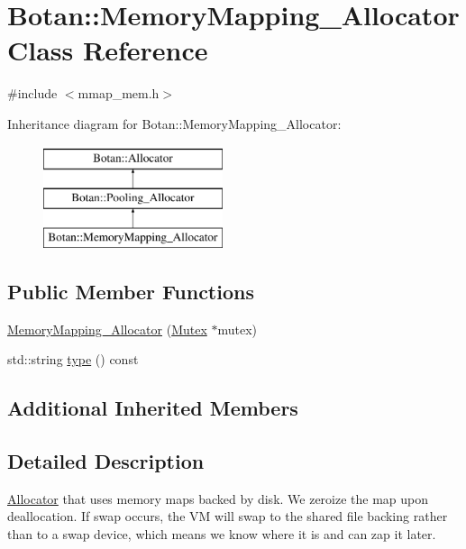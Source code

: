 \hypertarget{classBotan_1_1MemoryMapping__Allocator}{\section{Botan\-:\-:Memory\-Mapping\-\_\-\-Allocator Class Reference}
\label{classBotan_1_1MemoryMapping__Allocator}
}


{\ttfamily \#include $<$mmap\-\_\-mem.\-h$>$}

Inheritance diagram for Botan\-:\-:Memory\-Mapping\-\_\-\-Allocator\-:\begin{figure}[H]
\begin{center}
\leavevmode
\includegraphics[height=3.000000cm]{classBotan_1_1MemoryMapping__Allocator}
\end{center}
\end{figure}
\subsection*{Public Member Functions}
\begin{DoxyCompactItemize}
\item 
\hyperlink{classBotan_1_1MemoryMapping__Allocator_a317b0927ad6a4953f715e5b0543896c3}{Memory\-Mapping\-\_\-\-Allocator} (\hyperlink{classBotan_1_1Mutex}{Mutex} $\ast$mutex)
\item 
std\-::string \hyperlink{classBotan_1_1MemoryMapping__Allocator_a0ec1bd7d71ff4dff0bbb9c10f21b3b08}{type} () const 
\end{DoxyCompactItemize}
\subsection*{Additional Inherited Members}


\subsection{Detailed Description}
\hyperlink{classBotan_1_1Allocator}{Allocator} that uses memory maps backed by disk. We zeroize the map upon deallocation. If swap occurs, the V\-M will swap to the shared file backing rather than to a swap device, which means we know where it is and can zap it later. 

